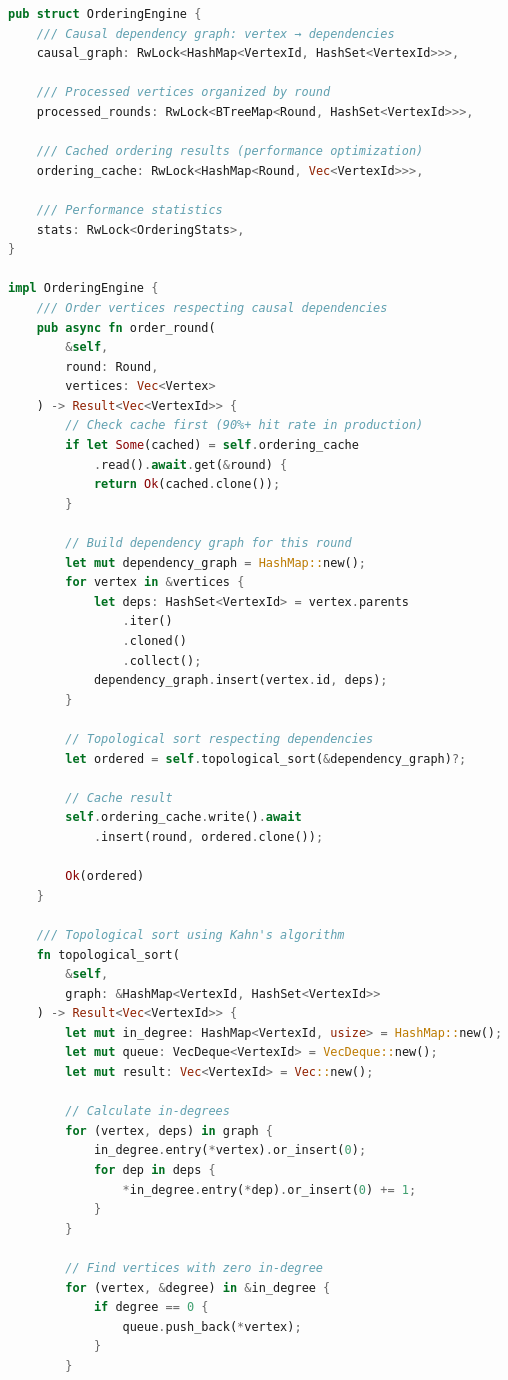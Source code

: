 \documentclass[11pt,a4paper]{article}
\begin{document}
\begin{lstlisting}[language=Rust,caption={Causal Ordering Engine for DAG}]
pub struct OrderingEngine {
    /// Causal dependency graph: vertex → dependencies
    causal_graph: RwLock<HashMap<VertexId, HashSet<VertexId>>>,

    /// Processed vertices organized by round
    processed_rounds: RwLock<BTreeMap<Round, HashSet<VertexId>>>,

    /// Cached ordering results (performance optimization)
    ordering_cache: RwLock<HashMap<Round, Vec<VertexId>>>,

    /// Performance statistics
    stats: RwLock<OrderingStats>,
}

impl OrderingEngine {
    /// Order vertices respecting causal dependencies
    pub async fn order_round(
        &self,
        round: Round,
        vertices: Vec<Vertex>
    ) -> Result<Vec<VertexId>> {
        // Check cache first (90%+ hit rate in production)
        if let Some(cached) = self.ordering_cache
            .read().await.get(&round) {
            return Ok(cached.clone());
        }

        // Build dependency graph for this round
        let mut dependency_graph = HashMap::new();
        for vertex in &vertices {
            let deps: HashSet<VertexId> = vertex.parents
                .iter()
                .cloned()
                .collect();
            dependency_graph.insert(vertex.id, deps);
        }

        // Topological sort respecting dependencies
        let ordered = self.topological_sort(&dependency_graph)?;

        // Cache result
        self.ordering_cache.write().await
            .insert(round, ordered.clone());

        Ok(ordered)
    }

    /// Topological sort using Kahn's algorithm
    fn topological_sort(
        &self,
        graph: &HashMap<VertexId, HashSet<VertexId>>
    ) -> Result<Vec<VertexId>> {
        let mut in_degree: HashMap<VertexId, usize> = HashMap::new();
        let mut queue: VecDeque<VertexId> = VecDeque::new();
        let mut result: Vec<VertexId> = Vec::new();

        // Calculate in-degrees
        for (vertex, deps) in graph {
            in_degree.entry(*vertex).or_insert(0);
            for dep in deps {
                *in_degree.entry(*dep).or_insert(0) += 1;
            }
        }

        // Find vertices with zero in-degree
        for (vertex, &degree) in &in_degree {
            if degree == 0 {
                queue.push_back(*vertex);
            }
        }


\end{lstlisting}
\end{document}
